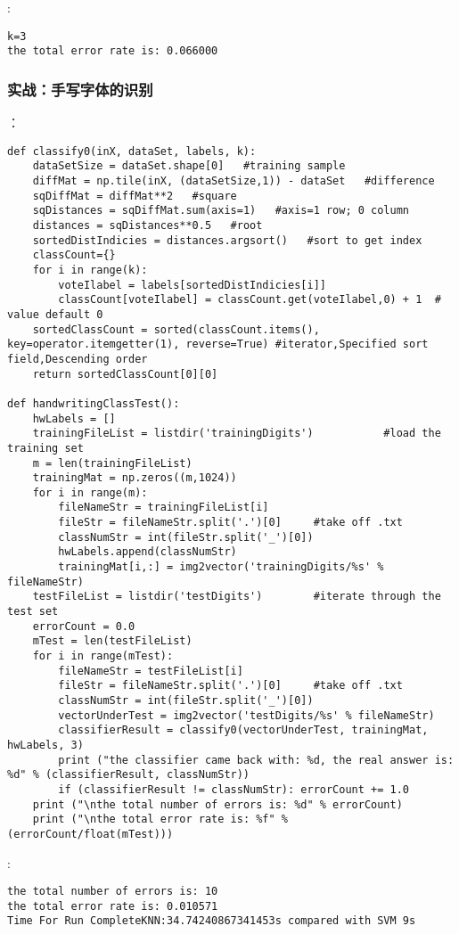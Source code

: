 :
\begin{lstlisting}
k=3
the total error rate is: 0.066000
\end{lstlisting}

\subsubsection{实战：手写字体的识别}
：
\begin{lstlisting}
def classify0(inX, dataSet, labels, k):
    dataSetSize = dataSet.shape[0]   #training sample
    diffMat = np.tile(inX, (dataSetSize,1)) - dataSet   #difference
    sqDiffMat = diffMat**2   #square
    sqDistances = sqDiffMat.sum(axis=1)   #axis=1 row; 0 column
    distances = sqDistances**0.5   #root
    sortedDistIndicies = distances.argsort()   #sort to get index
    classCount={}
    for i in range(k):
        voteIlabel = labels[sortedDistIndicies[i]]
        classCount[voteIlabel] = classCount.get(voteIlabel,0) + 1  # value default 0
    sortedClassCount = sorted(classCount.items(), key=operator.itemgetter(1), reverse=True) #iterator,Specified sort field,Descending order
    return sortedClassCount[0][0]

def handwritingClassTest():
    hwLabels = []
    trainingFileList = listdir('trainingDigits')           #load the training set
    m = len(trainingFileList)
    trainingMat = np.zeros((m,1024))
    for i in range(m):
        fileNameStr = trainingFileList[i]
        fileStr = fileNameStr.split('.')[0]     #take off .txt
        classNumStr = int(fileStr.split('_')[0])
        hwLabels.append(classNumStr)
        trainingMat[i,:] = img2vector('trainingDigits/%s' % fileNameStr)
    testFileList = listdir('testDigits')        #iterate through the test set
    errorCount = 0.0
    mTest = len(testFileList)
    for i in range(mTest):
        fileNameStr = testFileList[i]
        fileStr = fileNameStr.split('.')[0]     #take off .txt
        classNumStr = int(fileStr.split('_')[0])
        vectorUnderTest = img2vector('testDigits/%s' % fileNameStr)
        classifierResult = classify0(vectorUnderTest, trainingMat, hwLabels, 3)
        print ("the classifier came back with: %d, the real answer is: %d" % (classifierResult, classNumStr))
        if (classifierResult != classNumStr): errorCount += 1.0
    print ("\nthe total number of errors is: %d" % errorCount)
    print ("\nthe total error rate is: %f" % (errorCount/float(mTest)))
\end{lstlisting}
:
\begin{lstlisting}
the total number of errors is: 10
the total error rate is: 0.010571
Time For Run CompleteKNN:34.74240867341453s compared with SVM 9s
\end{lstlisting}

